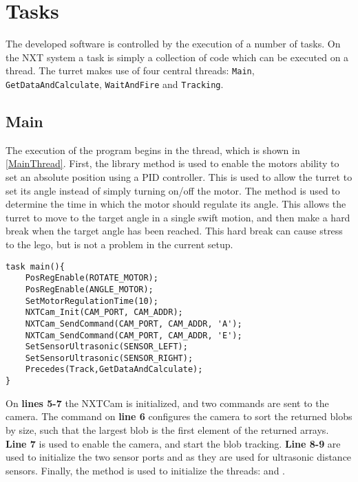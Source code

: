 \section{Tasks}
The developed software is controlled by the execution of a number of
tasks. On the NXT system a task is simply a collection of code which can be
executed on a thread. The turret makes use of four central threads:
\texttt{Main}, \texttt{GetDataAndCalculate}, \texttt{WaitAndFire} and
\texttt{Tracking}.

\subsection{Main}
The execution of the program begins in the  thread, which is shown
in \autoref{MainThread}. First, the library method
 is used to enable the motors ability to set
an absolute position using a PID controller. This is used to allow the turret to set its angle instead of simply turning on/off the motor.
The  method is used to determine the
time in which the motor should regulate its angle. This allows the turret to
move to the target angle in a single swift motion, and then make a hard break
when the target angle has been reached. This hard break can cause stress to the
lego, but is not a problem in the current setup.

\begin{minipage}[H]{\linewidth}
\begin{lstlisting}[caption = Entry point for the program execution., label = MainThread] 
task main(){
    PosRegEnable(ROTATE_MOTOR);
    PosRegEnable(ANGLE_MOTOR);
    SetMotorRegulationTime(10);
    NXTCam_Init(CAM_PORT, CAM_ADDR);
    NXTCam_SendCommand(CAM_PORT, CAM_ADDR, 'A');
    NXTCam_SendCommand(CAM_PORT, CAM_ADDR, 'E');
    SetSensorUltrasonic(SENSOR_LEFT);
    SetSensorUltrasonic(SENSOR_RIGHT);
    Precedes(Track,GetDataAndCalculate);
}
\end{lstlisting}
\end{minipage}

On \textbf{lines 5-7} the NXTCam is initialized, and two commands are
sent to the camera. The command on \textbf{line 6} configures the camera
to sort the returned blobs by size, such that the largest blob is the first
element of the returned arrays. \textbf{Line 7} is used to enable the camera,
and start the blob tracking. \textbf{Line 8-9} are used to
initialize the two sensor ports  and
 as they are used for ultrasonic distance sensors.
Finally, the  method is used to initialize the
threads:  and .
